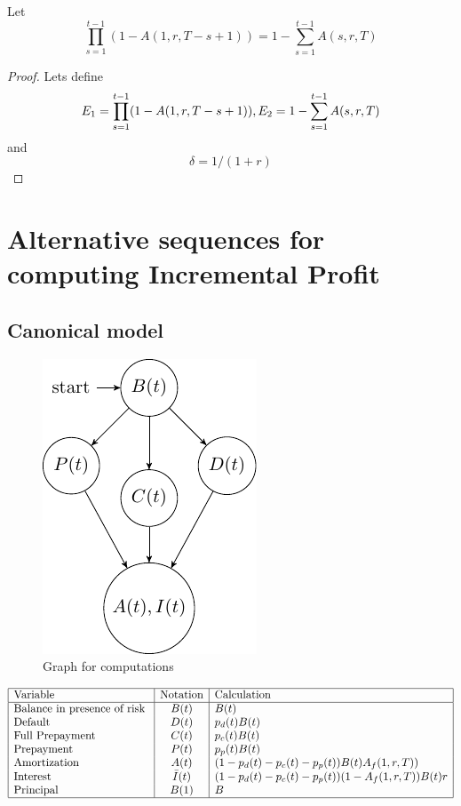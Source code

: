 \documentclass[12pt]{book}
\newenvironment{theorem}[2][Theorem]{\begin{trivlist}
\item[\hskip \labelsep {\bfseries #1}\hskip \labelsep {\bfseries #2.}]}{\end{trivlist}}
\begin{document}
\begin{theorem}{1.1 (Telescopic amortizations)}{} Let
\[
\prod^{t-1}_{s=1}(1-A(1,r,T-s+1))=1-\sum^{t-1}_{s=1}A(s,r,T)
\]
\end{theorem}

\begin{proof}{}{} Lets define
\[
E_1=\prod^{t-1}_{s=1}(1-A(1,r,T-s+1)), \\
E_2 =1-\sum^{t-1}_{s=1}A(s,r,T)
\]
and
\[
\delta =1/(1+r)
\]


\end{proof}

\section{Alternative sequences for computing Incremental Profit}



\subsection{Canonical model}
\begin{figure}[H]
  \centering
      \includegraphics[width=.3\textwidth]{Graph2.pdf} 
 \caption{Graph for computations}
 \label{fig:graph2}
\end{figure}

\begin{center} %
\[ %
\begin{array}{|l|c|l|} \hline %
\mbox{Variable} &\mbox{Notation} & \mbox{Calculation}\\ \hline
\mbox{Balance in presence of risk }  & B(t)  & B(t)\\
\mbox{Default  }  & D(t) & p_d(t) B(t)\\
\mbox{Full Prepayment}  & C(t) & p_c(t) B(t)\\
\mbox{Prepayment  }  & P(t) & p_p(t)B(t)\\
\mbox{Amortization}  & A(t) &(1-p_d(t)-p_c(t)-p_p(t)) B(t)A_f(1,r,T))\\
\mbox{Interest }  & \bar{I}(t) & (1-p_d(t)-p_c(t)-p_p(t))(1-A_f(1,r,T))B(t)r\\
\mbox{Principal   }  &  B(1) & B\\
\hline
\end{array} %
\] %
\end{center}
\pagebreak
\end{document}
